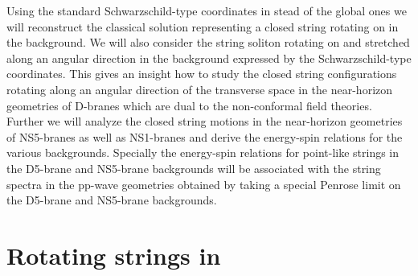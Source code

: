 \documentclass[12pt,a4paper]{article}
\begin{document}
Using the standard Schwarzschild-type coordinates in stead of 
the global ones we will reconstruct the classical 
solution representing a closed string rotating on \coordHE{} in the 
\coordHE{} background. We will also consider the string 
soliton rotating on \coordHE{}
and stretched along an angular direction in the \coordHE{} 
background expressed by the Schwarzschild-type coordinates. This gives
an insight how to study the closed string configurations rotating along an
angular direction of the transverse space in the near-horizon geometries 
of D\coordHE{}-branes which are dual to the non-conformal field theories.
Further we will analyze the closed string motions in the near-horizon 
geometries of NS5-branes as well as NS1-branes and derive the 
energy-spin relations for the  various backgrounds.
Specially the energy-spin relations for point-like strings in the D5-brane
and NS5-brane backgrounds will be associated with the string spectra in
the pp-wave geometries obtained by taking a special 
Penrose limit on the D5-brane and NS5-brane backgrounds.

\section{Rotating strings in \coordHE{}}
\end{document}
